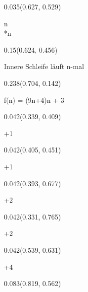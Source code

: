 \documentclass[aspectratio=169]{beamer}
\begin{document}
\begin{frame}[fragile]
\begin{textblock}{0.035}(0.627, 0.529)
  \begin{minipage}[t][0.054\paperheight]{\linewidth}
    {\tiny *n\\*n}
  \end{minipage}
\end{textblock}
\begin{textblock}{0.15}(0.624, 0.456)
  \begin{minipage}[t][0.094\paperheight]{\linewidth}
    {\tiny Innere Schleife läuft n-mal}
  \end{minipage}
\end{textblock}
\begin{textblock}{0.238}(0.704, 0.142)
  \begin{minipage}[t][0.168\paperheight]{\linewidth}
    {\tiny f(n) = (9n+4)n + 3}
  \end{minipage}
\end{textblock}
\begin{textblock}{0.042}(0.339, 0.409)
  \begin{minipage}[t][0.044\paperheight]{\linewidth}
    {\tiny +1}
  \end{minipage}
\end{textblock}
\begin{textblock}{0.042}(0.405, 0.451)
  \begin{minipage}[t][0.044\paperheight]{\linewidth}
    {\tiny +1}
  \end{minipage}
\end{textblock}
\begin{textblock}{0.042}(0.393, 0.677)
  \begin{minipage}[t][0.044\paperheight]{\linewidth}
    {\tiny +2}
  \end{minipage}
\end{textblock}
\begin{textblock}{0.042}(0.331, 0.765)
  \begin{minipage}[t][0.044\paperheight]{\linewidth}
    {\tiny +2}
  \end{minipage}
\end{textblock}
\begin{textblock}{0.042}(0.539, 0.631)
  \begin{minipage}[t][0.044\paperheight]{\linewidth}
    {\tiny +4}
  \end{minipage}
\end{textblock}
\begin{textblock}{0.083}(0.819, 0.562)
  \begin{minipage}[t][0.044\paperheight]{\linewidth}

\end{minipage}
\end{textblock}
\end{frame}
\end{document}
